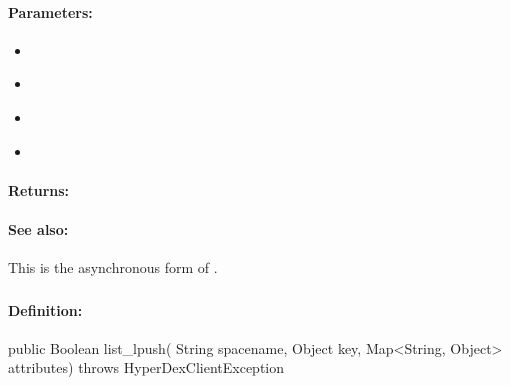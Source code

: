 \paragraph{Parameters:}
\begin{itemize}[noitemsep]
\item {}\\

\item {}\\

\item {}\\

\item {}\\

\end{itemize}

\paragraph{Returns:}


\paragraph{See also:}  This is the asynchronous form of .

\pagebreak
\subsubsection{}
\label{api:java:list_lpush}


\paragraph{Definition:}
\begin{javacode}
public Boolean list_lpush(
        String spacename,
        Object key,
        Map<String, Object> attributes) throws HyperDexClientException
\end{javacode}

